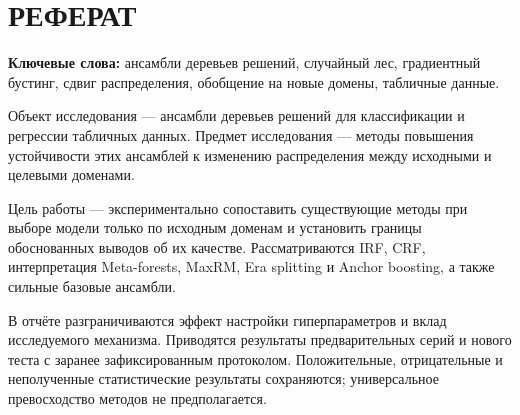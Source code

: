 \chapter*{РЕФЕРАТ}
\noindent\textbf{Ключевые слова:} ансамбли деревьев решений, случайный лес, градиентный бустинг, сдвиг распределения, обобщение на новые домены, табличные данные.

Объект исследования --- ансамбли деревьев решений для классификации и регрессии табличных данных. Предмет исследования --- методы повышения устойчивости этих ансамблей к изменению распределения между исходными и целевыми доменами.

Цель работы --- экспериментально сопоставить существующие методы при выборе модели только по исходным доменам и установить границы обоснованных выводов об их качестве. Рассматриваются IRF, CRF, интерпретация Meta-forests, MaxRM, Era splitting и Anchor boosting, а также сильные базовые ансамбли.

В отчёте разграничиваются эффект настройки гиперпараметров и вклад исследуемого механизма. Приводятся результаты предварительных серий и нового теста с заранее зафиксированным протоколом. Положительные, отрицательные и неполученные статистические результаты сохраняются; универсальное превосходство методов не предполагается.
